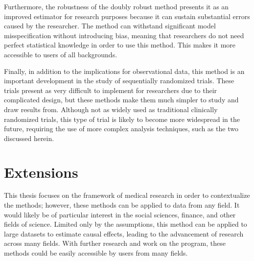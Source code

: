 Furthermore, the robustness of the doubly robust method presents it as an improved estimator for research purposes because it can sustain substantial errors caused by the researcher.  The method can withstand significant model misspecification without introducing bias, meaning that researchers do not need perfect statistical knowledge in order to use this method.  This makes it more accessible to users of all backgrounds.    

Finally, in addition to the implications for observational data, this method is an important development in the study of sequentially randomized trials.  These trials present as very difficult to implement for researchers due to their complicated design, but these methods make them much simpler to study and draw results from.  Although not as widely used as traditional clinically randomized trials, this type of trial is likely to become more widespread in the future, requiring the use of more complex analysis techniques, such as the two discussed herein.  

\section{Extensions}
This thesis focuses on the framework of medical research in order to contextualize the methods; however, these methods can be applied to data from any field.  It would likely be of particular interest in the social sciences, finance, and other fields of science.  Limited only by the assumptions, this method can be applied to large datasets to estimate causal effects, leading to the advancement of research across many fields.  With further research and work on the program, these methods could be easily accessible by users from many fields.  

